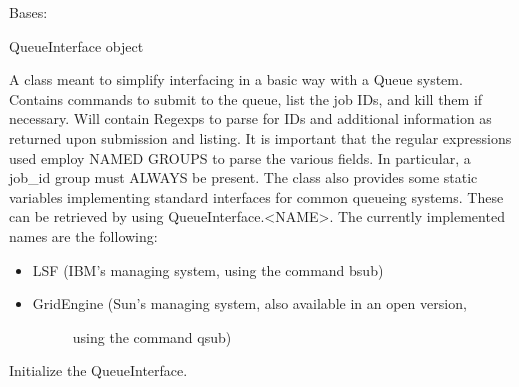 \documentclass[letterpaper,10pt,english]{sphinxmanual}
\begin{document}
\begin{fulllineitems}
\label{doctree/soprano.hpc.submitter.queues:soprano.hpc.submitter.queues.QueueInterface}
Bases: 

QueueInterface object

A class meant to simplify interfacing in a basic way
with a Queue system. Contains commands to submit to the queue, list the
job IDs, and kill them if necessary. Will contain Regexps to parse for IDs
and additional information as returned upon submission and listing.
It is important that the regular expressions used employ NAMED GROUPS to
parse the various fields. In particular, a job\_id group must ALWAYS be
present.
The class also provides some static variables implementing standard
interfaces for common queueing systems. These can be retrieved by using
QueueInterface.\textless{}NAME\textgreater{}. The currently implemented names are the following:
\begin{itemize}
\item {} 
LSF (IBM's managing system, using the command bsub)

\item {} \begin{description}
\item[{GridEngine (Sun's managing system, also available in an open version,}] \leavevmode
using the command qsub)

\end{description}

\end{itemize}

Initialize the QueueInterface.


\end{fulllineitems}
\end{document}
